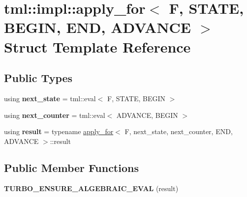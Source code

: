 \hypertarget{structtml_1_1impl_1_1apply__for}{\section{tml\+:\+:impl\+:\+:apply\+\_\+for$<$ F, S\+T\+A\+T\+E, B\+E\+G\+I\+N, E\+N\+D, A\+D\+V\+A\+N\+C\+E $>$ Struct Template Reference}
\label{structtml_1_1impl_1_1apply__for}
}
\subsection*{Public Types}
\begin{DoxyCompactItemize}
\item 
\hypertarget{structtml_1_1impl_1_1apply__for_adfb6f68ff76b5798d17b383835902fa6}{using {\bfseries next\+\_\+state} = tml\+::eval$<$ F, S\+T\+A\+T\+E, B\+E\+G\+I\+N $>$}\label{structtml_1_1impl_1_1apply__for_adfb6f68ff76b5798d17b383835902fa6}

\item 
\hypertarget{structtml_1_1impl_1_1apply__for_a70e9ccf315dcffc699ebb5174880ff13}{using {\bfseries next\+\_\+counter} = tml\+::eval$<$ A\+D\+V\+A\+N\+C\+E, B\+E\+G\+I\+N $>$}\label{structtml_1_1impl_1_1apply__for_a70e9ccf315dcffc699ebb5174880ff13}

\item 
\hypertarget{structtml_1_1impl_1_1apply__for_ad8f0df544935814f6fcf88560e4b722f}{using {\bfseries result} = typename \hyperlink{structtml_1_1impl_1_1apply__for}{apply\+\_\+for}$<$ F, next\+\_\+state, next\+\_\+counter, E\+N\+D, A\+D\+V\+A\+N\+C\+E $>$\+::result}\label{structtml_1_1impl_1_1apply__for_ad8f0df544935814f6fcf88560e4b722f}

\end{DoxyCompactItemize}
\subsection*{Public Member Functions}
\begin{DoxyCompactItemize}
\item 
\hypertarget{structtml_1_1impl_1_1apply__for_ae2707e76fce5486177b57b7bf7e08a37}{{\bfseries T\+U\+R\+B\+O\+\_\+\+E\+N\+S\+U\+R\+E\+\_\+\+A\+L\+G\+E\+B\+R\+A\+I\+C\+\_\+\+E\+V\+A\+L} (result)}\label{structtml_1_1impl_1_1apply__for_ae2707e76fce5486177b57b7bf7e08a37}

\end{DoxyCompactItemize}



